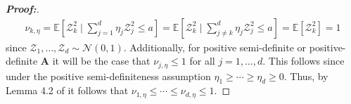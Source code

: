 \documentclass[11pt,twoside]{article}
\theoremstyle{definition}
\theoremstyle{remark}
\begin{document}
\begin{proof}[\textbf{Proof:}]
\begin{align*}
    \nu_{k, \eta} = \mathbb{E}\left[\mathcal{Z}^2_k \mid   \sum^d_{j=1} \eta_j \mathcal{Z}^2_j \leq a\right] = \mathbb{E}\left[\mathcal{Z}^2_k \mid   \sum^d_{j \neq k} \eta_j \mathcal{Z}^2_j \leq a\right] = \mathbb{E}\left[\mathcal{Z}^2_k\right] = 1
\end{align*}
since $\mathcal{Z}_1, \ldots, \mathcal{Z}_d \sim \mathcal{N}(0, 1)$. Additionally, for positive semi-definite or positive-definite $\mathbf{A}$ it will be the case that $\nu_{j, \eta} \leq 1$ for all $j = 1, \ldots, d$. This follows since under the positive semi-definiteness assumption $\eta_1 \geq \cdots \geq \eta_d \geq 0$. Thus, by Lemma 4.2 of \cite{branson2021ridge} it follows that $\nu_{1, \eta}  \leq \cdots \leq \nu_{d, \eta} \leq 1$.
\end{proof}
\end{document}
